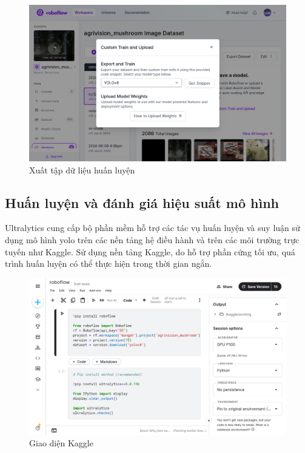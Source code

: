 \begin{figure}[H]
    \centering
    \includegraphics[width=0.85\linewidth]{images/export-dataset.png}
    \caption{Xuất tập dữ liệu huấn luyện}
    \label{fig:export-dataset}
\end{figure}

\subsection{Huấn luyện và đánh giá hiệu suất mô hình}

Ultralytics \cite{yolov8_ultralytics} cung cấp bộ phần mềm hỗ trợ các tác vụ huấn luyện và suy luận sử dụng mô hình \acrshort{yolo} trên các nền tảng hệ điều hành và trên các môi trường trực tuyến như Kaggle. Sử dụng nền tảng Kaggle, do hỗ trợ phần cứng tối ưu, quá trình huấn luyện có thể thực hiện trong thời gian ngắn.

\begin{figure}[h]
	\centering
	\includegraphics[width=0.9\linewidth]{images/ui-kaggle}
	\caption{Giao diện Kaggle}
	\label{fig:ui-kaggle}
\end{figure}


